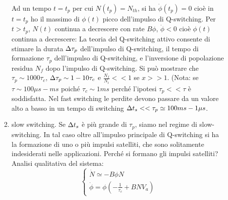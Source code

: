 \begin{description}
\begin{enumerate}
Ad un tempo $t = t_p$ per cui $N(t_p) = N_{th}$, si ha $\dot{\phi}(t_p) = 0$ cioè in $t=t_p$ ho il massimo di $\phi(t)$ picco dell'impulso di Q-switching. Per $t > t_p$, $N(t)$ continua a decrescere con rate $B\phi$, $\dot{\phi}<0$ cioè $\phi(t)$ continua a decrescere:
La teoria del Q-switching attivo consente di stimare la durata $\Delta \tau_p$ dell'impulso di Q-switching, il tempo di formazione $\tau_p$ dell'impulso di Q-switching, e l'inversione di popolazione residua $N_f$ dopo l'impulso di Q-switching. Si può mostrare che $\tau_p \sim 1000 \tau_c$, $\Delta\tau_p \sim 1-10\tau_c$ e $\frac{N_f}{N_i}<<1$ se $x>>1$. (Nota: se $\tau \sim 100 \mu s - ms$ poiché $\tau_c \sim 1ms$ perché l'ipotesi $\tau_p << \tau$ è soddisfatta. Nel fast switching le perdite devono passare da un valore alto a basso in un tempo di switching $\Delta t_s << \tau_p \simeq 100 ms - 1 \mu s$.
\item slow switching. Se $\Delta t_s$ è più grande di $\tau_p$, siamo nel regime di slow-switching. In tal caso oltre all'impulso principale di Q-switching si ha la formazione di uno o più impulsi satelliti, che sono solitamente indesiderati nelle applicazioni. Perché si formano gli impulsi satelliti? Analisi qualitativa del sistema:
\begin{equation*}
\begin{cases}
\dot{N} \simeq - B\phi N\\
\dot{\phi} = \phi(-\frac{1}{\tau_c} + BN V_a)
\end{cases}
\end{equation*}
\end{enumerate}
\end{description}


